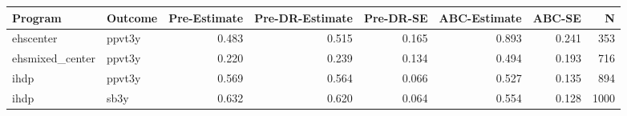 \begin{table}[ht]
\centering
\begin{tabular}{llrrrrrr}
  \hline
Program & Outcome & Pre-Estimate & Pre-DR-Estimate & Pre-DR-SE & ABC-Estimate & ABC-SE & N \\ 
  \hline
ehscenter & ppvt3y & 0.483 & 0.515 & 0.165 & 0.893 & 0.241 & 353 \\ 
  ehsmixed\_center & ppvt3y & 0.220 & 0.239 & 0.134 & 0.494 & 0.193 & 716 \\ 
  ihdp & ppvt3y & 0.569 & 0.564 & 0.066 & 0.527 & 0.135 & 894 \\ 
  ihdp & sb3y & 0.632 & 0.620 & 0.064 & 0.554 & 0.128 & 1000 \\ 
   \hline
\end{tabular}
\end{table}
